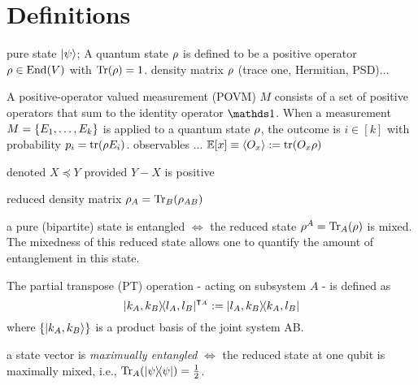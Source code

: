 

\section{Definitions}\label{sec:definitions}
\begin{definition}\label{def:density_matrix}
	pure state $\ket{\psi}$;
	A quantum state $\rho$ is defined to be a positive operator $ \rho \in \text{End}(V )$ with $\Tr( \rho ) = 1$.
	density matrix $\rho$ (trace one, Hermitian, PSD)...
\end{definition}
\begin{definition}[POVM]\label{def:povm}
	A positive-operator valued measurement (POVM) $M$ consists of a set of positive operators that sum to the identity operator $\identity$. 
	When a measurement $M = \qty{ E_1 , \dots , E_k }$ is applied to a quantum state $\rho$, the outcome is $i \in [k]$ with probability $p_i = \tr( \rho E_i )$.
	observables ... $\mathbb{E}[x]\equiv\expval{O_x}:=\tr(O_x\rho)$
\end{definition}
\begin{definition}\label{def:psd}
	denoted $X \preceq Y $ provided $Y-X $ is positive
\end{definition}
\begin{definition}\label{def:partial_trace}
	reduced density matrix $\rho_A = \Tr_B(\rho_{AB})$
\end{definition}
\begin{remark}
	a pure (bipartite) state is entangled $\iff$ the reduced state $\rho^A=\Tr_A(\rho)$ is mixed.
	The mixedness of this reduced state allows one to quantify the amount of entanglement in this state.
\end{remark}
\begin{definition}\label{def:partial_transpose}
	\cite{horodeckiSeparabilityMixedStates1996}
	The partial transpose (PT) operation - acting on subsystem $A$ - is defined as
	\begin{equation}
		\op{k_A,k_B}{l_A,l_B}^{\intercal_A}
		:= \op{l_A,k_B}{k_A,l_B}
	\end{equation}
	where $\qty{\ket{k_A,k_B}}$ is a product basis of the joint system AB.
\end{definition}
\begin{definition}
	a state vector is \emph{maximually entangled} $\iff$ the reduced state at one qubit is maximally mixed, i.e.,
	$\Tr_A(\op{\psi})=\frac{1}{2}$.
\end{definition}

